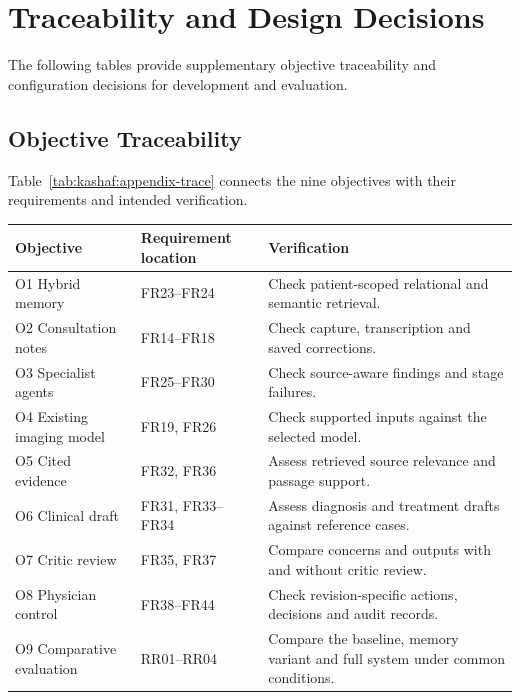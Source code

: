 \begingroup
\renewcommand{\encodingdefault}{T1}
\selectfont
\chapter{Traceability and Design Decisions}

The following tables provide supplementary objective traceability and configuration decisions for development and evaluation.

\section{Objective Traceability}
Table~\ref{tab:kashaf:appendix-trace} connects the nine objectives with their requirements and intended verification.

\begin{reporttable}
\centering
\small
\caption{Objectives, requirement locations and intended verification.}
\label{tab:kashaf:appendix-trace}
\begin{tabular}{|p{}|p{}|p{}|}
\hline
Objective & Requirement location & Verification \\ \hline
O1 Hybrid memory & FR23--FR24 & Check patient-scoped relational and semantic retrieval. \\ \hline
O2 Consultation notes & FR14--FR18 & Check capture, transcription and saved corrections. \\ \hline
O3 Specialist agents & FR25--FR30 & Check source-aware findings and stage failures. \\ \hline
O4 Existing imaging model & FR19, FR26 & Check supported inputs against the selected model. \\ \hline
O5 Cited evidence & FR32, FR36 & Assess retrieved source relevance and passage support. \\ \hline
O6 Clinical draft & FR31, FR33--FR34 & Assess diagnosis and treatment drafts against reference cases. \\ \hline
O7 Critic review & FR35, FR37 & Compare concerns and outputs with and without critic review. \\ \hline
O8 Physician control & FR38--FR44 & Check revision-specific actions, decisions and audit records. \\ \hline
O9 Comparative evaluation & RR01--RR04 & Compare the baseline, memory variant and full system under common conditions. \\ \hline
\end{tabular}
\end{reporttable}

